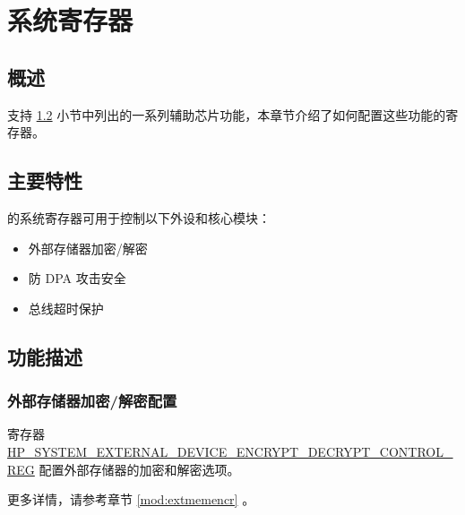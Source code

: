 \documentclass[main\_\_CN.tex]{subfiles}
\begin{document}

\ifglobal
\else
    {\let\clearpage\relax \listoftodos}
    \tableofcontents
\fi



\chapter{系统寄存器}
\label{mod:sysreg}
\hypertarget{sysreg}{}


\section{概述}

\chipname{} 支持 \ref{sec:sysreg-features} \textit{} 小节中列出的一系列辅助芯片功能，本章节介绍了如何配置这些功能的寄存器。


\section{主要特性}
\label{sec:sysreg-features}

\chipname{} 的系统寄存器可用于控制以下外设和核心模块：

\begin{itemize}
    \item 外部存储器加密/解密
    \item 防 DPA 攻击安全
    \item 总线超时保护
\end{itemize}


\section{功能描述}

\subsection{外部存储器加密/解密配置}

寄存器 \hyperref[regdesc:HPSYSTEMEXTERNALDEVICEENCRYPTDECRYPTCONTROLREG]{HP\_SYSTEM\_EXTERNAL\_DEVICE\_ENCRYPT\_DECRYPT\_CONTROL\_REG} 配置外部存储器的加密和解密选项。

更多详情，请参考章节 \ref{mod:extmemencr} \textit{}。
\end{document}
